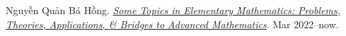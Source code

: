 \documentclass[oneside]{book}
\numberwithin{equation}{section}
\begin{document}

\begin{thebibliography}{99}
	 Nguyễn Quản Bá Hồng. \href{https://github.com/NQBH/hobby/blob/master/elementary_mathematics/NQBH_elementary_mathematics.pdf}{\textit{Some Topics in Elementary Mathematics: Problems, Theories, Applications, \textit{\&} Bridges to Advanced Mathematics}}. Mar 2022--now.
\end{thebibliography}


\printbibliography[heading=bibintoc]
	
\end{document}
